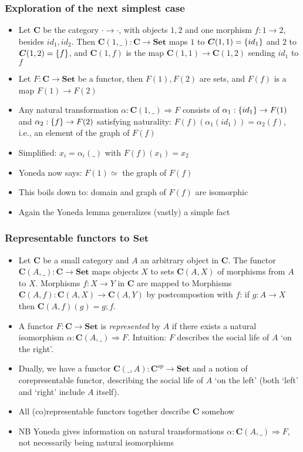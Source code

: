\documentclass[handout]{beamer}
\newcommand{\To}{\Rightarrow}
\newcommand{\bfsf}[1]{{\boldsymbol{#1}}}
\newcommand{\Set}{\bfsf{Set}}
\newcommand{\CC}{\bfsf{C}}
\begin{document}
\frame
  {   
    \frametitle{Exploration of the next simplest case}\label{Yon:Triv}

 \begin{itemize}[<+->]
\item Let $\CC$ be the category ${\cdot}{\to}{\cdot}$, with objects $1,2$ and
one morphism $f:1\to 2$, besides $id_1,id_2$. Then $\CC(1,\_):\CC\to\Set$ maps
$1$ to $\CC(1,1) = \set{id_1}$ and $2$ to $\CC(1,2) = \set{f}$, and
$\CC(1,f)$ is the map $\CC(1,1)\to\CC(1,2)$ sending $id_1$ to $f$  
\item Let $F:\CC\to\Set$ be a functor, then $F(1), F(2)$ are sets, and
$F(f)$ is a map ${F(1)}\to{F(2)}$
\item Any natural transformation $\alpha: \CC(1,\_)\To F$ consists of
$\alpha_1: \{id_1\} \to F(1)$ and $\alpha_2: \{f\} \to F(2)$ satisfying 
naturality: $F(f)(\alpha_1(id_1)) = \alpha_2(f)$, i.e., an element of the graph of $F(f)$
\item Simplified: $x_i =\alpha_i(\_)$ with %
$F(f)(x_1) = x_2$
\item Yoneda now says:   $F(1) \simeq{}$ the graph of $F(f)$
\item This boils down to: domain and graph of $F(f)$ are isomorphic
\item Again  the Yoneda lemma generalizes (vastly) a simple fact
 \end{itemize}

 }

\frame
  {   
    \frametitle{Representable functors to $\Set$}\label{Yon:ReprFun}

 \begin{itemize}[<+->]
\item Let $\CC$ be a small category and $A$ an arbitrary object in $\CC$. 
The functor  $\CC(A,\_):\CC\to\Set$ maps objects $X$ to sets $\CC(A,X)$
of morphisms from $A$ to $X$. Morphisms $f: X\to Y$ in $\CC$ are
mapped to Morphisms $\CC(A,f): \CC(A,X)\to\CC(A,Y)$ by
postcompostion with $f$: if $g:A\to X$ then $\CC(A,f)(g) = g;f$.
\item A functor $F:\CC\to\Set$ is \emph{represented} by $A$ if
there exists a natural isomorphism $\alpha: \CC(A,\_)\To F$.
Intuition: $F$ describes the social life of $A$ `on the right'.
\item Dually, we have a functor $\CC(\_,A):\CC^{op}\to\Set$
and a notion of corepresentable functor, 
describing the social life of $A$ `on the left' 
(both `left' and `right' include $A$ itself).
\item All (co)representable functors together describe $\CC$ somehow
\item NB Yoneda gives information on natural transformations 
$\alpha: \CC(A,\_)\To F$, not necessarily being natural isomorphisms

\end{itemize}

 }
\end{document}
